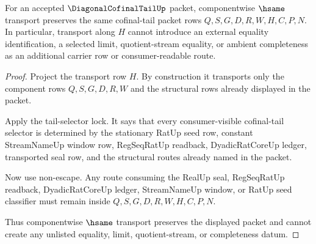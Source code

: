 \begin{theorem}
\label{thm:diagonal-cofinal-tail-hsame-transport-lock}
For an accepted $\DiagonalCofinalTailUp$ packet, componentwise $\hsame$ transport preserves the same cofinal-tail packet rows $Q,S,G,D,R,W,H,C,P,N$. In particular, transport along $H$ cannot introduce an external equality identification, a selected limit, quotient-stream equality, or ambient completeness as an additional carrier row or consumer-readable route.
\end{theorem}
\begin{proof}
Project the transport row $H$. By construction it transports only the component rows $Q,S,G,D,R,W$ and the structural rows already displayed in the packet.

Apply the tail-selector lock. It says that every consumer-visible cofinal-tail selector is determined by the stationary RatUp seed row, constant StreamNameUp window row, RegSeqRatUp readback, DyadicRatCoreUp ledger, transported seal row, and the structural routes already named in the packet.

Now use non-escape. Any route consuming the RealUp seal, RegSeqRatUp readback, DyadicRatCoreUp ledger, StreamNameUp window, or RatUp seed classifier must remain inside $Q,S,G,D,R,W,H,C,P,N$.

Thus componentwise $\hsame$ transport preserves the displayed packet and cannot create any unlisted equality, limit, quotient-stream, or completeness datum.
\end{proof}

